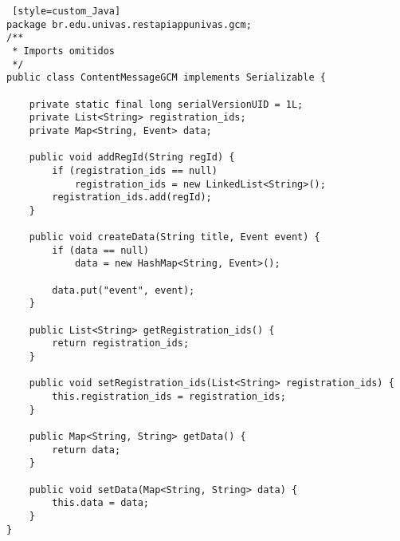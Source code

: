\begin{lstlisting} [style=custom_Java]
package br.edu.univas.restapiappunivas.gcm;
/**
 * Imports omitidos
 */
public class ContentMessageGCM implements Serializable {

	private static final long serialVersionUID = 1L;
	private List<String> registration_ids;
	private Map<String, Event> data;

	public void addRegId(String regId) {
		if (registration_ids == null)
			registration_ids = new LinkedList<String>();
		registration_ids.add(regId);
	}

	public void createData(String title, Event event) {
		if (data == null)
			data = new HashMap<String, Event>();

		data.put("event", event);
	}

	public List<String> getRegistration_ids() {
		return registration_ids;
	}

	public void setRegistration_ids(List<String> registration_ids) {
		this.registration_ids = registration_ids;
	}

	public Map<String, String> getData() {
		return data;
	}

	public void setData(Map<String, String> data) {
		this.data = data;
	}
}

	
\end{lstlisting}
